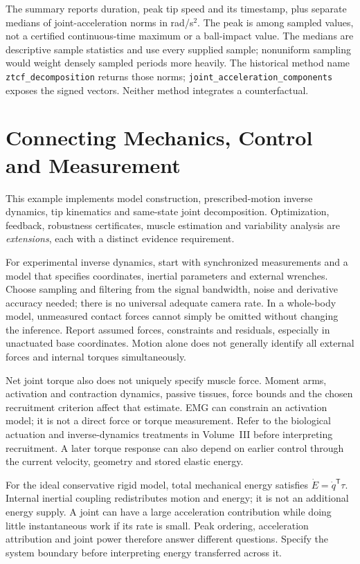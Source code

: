 The summary reports duration, peak tip speed and its timestamp, plus separate
medians of joint-acceleration norms in rad/s$^2$. The peak is among sampled
values, not a certified continuous-time maximum or a ball-impact value. The
medians are descriptive sample statistics and use every supplied sample;
nonuniform sampling would weight densely sampled periods more heavily.
The historical method name \texttt{ztcf\_decomposition} returns those norms;
\texttt{joint\_acceleration\_components} exposes the signed vectors.
Neither method integrates a counterfactual.

\section{Connecting Mechanics, Control and Measurement}

This example implements model construction, prescribed-motion inverse dynamics,
tip kinematics and same-state joint decomposition. Optimization, feedback,
robustness certificates, muscle estimation and variability analysis are
\emph{extensions}, each with a distinct evidence requirement.

For experimental inverse dynamics, start with synchronized measurements and a
model that specifies coordinates, inertial parameters and external wrenches.
Choose sampling and filtering from the signal bandwidth, noise and derivative
accuracy needed; there is no universal adequate camera rate. In a whole-body
model, unmeasured contact forces cannot simply be omitted without changing the
inference. Report assumed forces, constraints and residuals, especially in
unactuated base coordinates. Motion alone does not generally identify all
external forces and internal torques simultaneously.

Net joint torque also does not uniquely specify muscle force. Moment arms,
activation and contraction dynamics, passive tissues, force bounds and the
chosen recruitment criterion affect that estimate. EMG can constrain an
activation model; it is not a direct force or torque measurement. Refer to the
biological actuation and inverse-dynamics treatments in Volume~III before
interpreting recruitment. A later torque response can also depend on earlier
control through the current velocity, geometry and stored elastic energy.

For the ideal conservative rigid model, total mechanical energy satisfies
$\dot E=\dot q^{\mathsf T}\tau$. Internal inertial coupling redistributes
motion and energy; it is not an additional energy supply. A joint can have a
large acceleration contribution while doing little instantaneous work if its
rate is small. Peak ordering, acceleration attribution and joint power therefore
answer different questions. Specify the system boundary before interpreting
energy transferred across it.


